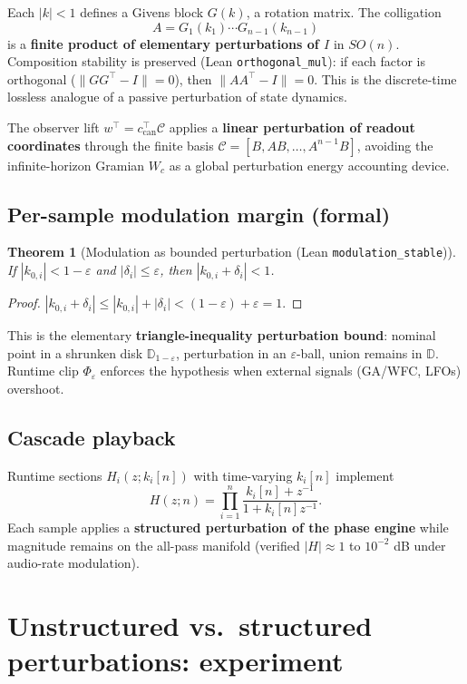 \documentclass[11pt]{article}
\newtheorem{theorem}{Theorem}
\begin{document}
Each $|k|<1$ defines a Givens block $G(k)$, a rotation matrix. The colligation
\[
A = G_1(k_1)\cdots G_{n-1}(k_{n-1})
\]
is a \textbf{finite product of elementary perturbations of $I$} in $SO(n)$. Composition stability is preserved (Lean \texttt{orthogonal\_mul}): if each factor is orthogonal ($\|G G^\top-I\|=0$), then $\|A A^\top-I\|=0$. This is the discrete-time lossless analogue of a passive perturbation of state dynamics.

The observer lift $w^\top=c_{\mathrm{can}}^\top\mathcal{C}$ applies a \textbf{linear perturbation of readout coordinates} through the finite basis $\mathcal{C}=[B,AB,\ldots,A^{n-1}B]$, avoiding the infinite-horizon Gramian $W_c$ as a global perturbation energy accounting device.

\subsection{Per-sample modulation margin (formal)}

\begin{theorem}[Modulation as bounded perturbation {\rm (Lean \texttt{modulation\_stable})}]
\label{thm:mod}
If $|k_{0,i}|<1-\varepsilon$ and $|\delta_i|\le\varepsilon$, then $|k_{0,i}+\delta_i|<1$.
\end{theorem}

\begin{proof}
$|k_{0,i}+\delta_i|\le |k_{0,i}|+|\delta_i| < (1-\varepsilon)+\varepsilon=1$.
\end{proof}

This is the elementary \textbf{triangle-inequality perturbation bound}: nominal point in a shrunken disk $\mathbb{D}_{1-\varepsilon}$, perturbation in an $\varepsilon$-ball, union remains in $\mathbb{D}$. Runtime clip $\Phi_\varepsilon$ enforces the hypothesis when external signals (GA/WFC, LFOs) overshoot.

\subsection{Cascade playback}

Runtime sections $H_i(z;k_i[n])$ with time-varying $k_i[n]$ implement
\[
H(z;n)=\prod_{i=1}^n \frac{k_i[n]+z^{-1}}{1+k_i[n]z^{-1}}.
\]
Each sample applies a \textbf{structured perturbation of the phase engine} while magnitude remains on the all-pass manifold (verified $|H|\approx 1$ to $10^{-2}$ dB under audio-rate modulation).

\section{Unstructured vs.\ structured perturbations: experiment}
\end{document}

